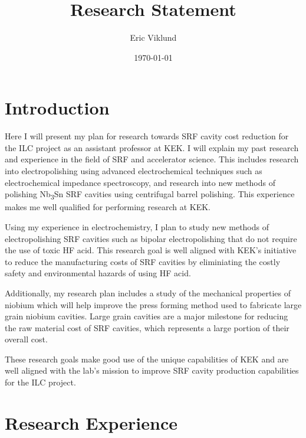 \documentclass[]{revtex4-2}
\begin{document}
\title{Research Statement}
\author{Eric Viklund}


\date{\today}


\maketitle

\section{Introduction}

    Here I will present my plan for research towards SRF cavity cost reduction for the ILC project as an assistant professor at KEK. I will explain my past research and experience in the field of SRF and accelerator science. This includes research into electropolishing using advanced electrochemical techniques such as electrochemical impedance spectroscopy, and research into new methods of polishing Nb\textsubscript{3}Sn SRF cavities using centrifugal barrel polishing. This experience makes me well qualified for performing research at KEK.

    Using my experience in electrochemistry, I plan to study new methods of electropolishing SRF cavities such as bipolar electropolishing that do not require the use of toxic HF acid. This research goal is well aligned with KEK's initiative to reduce the manufacturing costs of SRF cavities by eliminiating the costly safety and environmental hazards of using HF acid. 
    
    Additionally, my research plan includes a study of the mechanical properties of niobium which will help improve the press forming method used to fabricate large grain niobium cavities. Large grain cavities are a major milestone for reducing the raw material cost of SRF cavities, which represents a large portion of their overall cost. 
    
    These research goals make good use of the unique capabilities of KEK and are well aligned with the lab's mission to improve SRF cavity production capabilities for the ILC project.  

\section{Research Experience}
\end{document}
